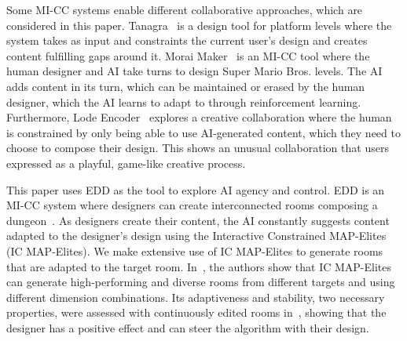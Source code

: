 Some MI-CC systems enable different collaborative approaches, which are considered in this paper. Tanagra~\cite{p13smith_tanagra_2011} is a design tool for platform levels where the system takes as input and constraints the current user's design and creates content fulfilling gaps around it. Morai Maker~\cite{p13guzdial_co-creative_2018} is an MI-CC tool where the human designer and AI take turns to design Super Mario Bros. levels. The AI adds content in its turn, which can be maintained or erased by the human designer, which the AI learns to adapt to through reinforcement learning. Furthermore, Lode Encoder~\cite{p13bhaumik_lode_2021} explores a creative collaboration where the human is constrained by only being able to use AI-generated content, which they need to choose to compose their design. This shows an unusual collaboration that users expressed as a playful, game-like creative process.



This paper uses EDD as the tool to explore AI agency and control. EDD is an MI-CC system where designers can create interconnected rooms composing a dungeon~\cite{p13alvarez_empowering_2019}. As designers create their content, the AI constantly suggests content adapted to the designer's design using the Interactive Constrained MAP-Elites (IC MAP-Elites). We make extensive use of IC MAP-Elites to generate rooms that are adapted to the target room. In~\cite{p13alvarez_interactive_2020}, the authors show that IC MAP-Elites can generate high-performing and diverse rooms from different targets and using different dimension combinations. Its adaptiveness and stability, two necessary properties, were assessed with continuously edited rooms in~\cite{p13alvarez_assessing_2021}, showing that the designer has a positive effect and can steer the algorithm with their design.







